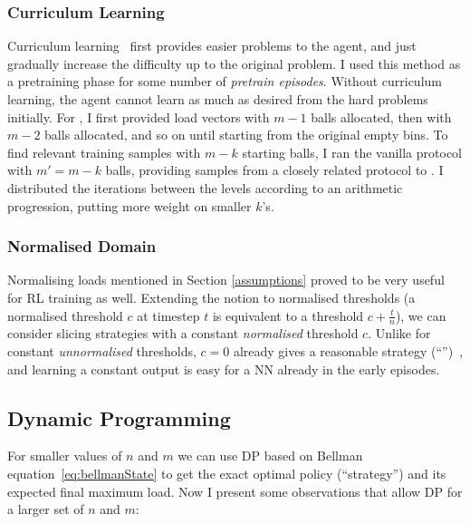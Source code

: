 \subsubsection*{Curriculum Learning}


Curriculum learning~\cite{bengio2009curriculumoriginal} first provides easier problems to the agent, and just gradually increase the difficulty up to the original problem. I used this method as a pretraining phase for some number of \textit{pretrain episodes}. Without curriculum learning, the agent cannot learn as much as desired from the hard problems initially. For \TwoThinning, I first provided load vectors with $m-1$ balls allocated, then with $m-2$ balls allocated, and so on until starting from the original empty bins. To find relevant training samples with $m-k$ starting balls, I ran the vanilla \OneChoice protocol with $m'=m-k$ balls, providing samples from a closely related protocol to \TwoThinning. I distributed the iterations between the levels according to an arithmetic progression, putting more weight on smaller $k$'s.



\subsubsection*{Normalised Domain} \label{normalised-domain}

Normalising loads mentioned in Section \ref{assumptions} proved to be very useful for RL training as well. Extending the notion to normalised thresholds (a normalised threshold $c$ at timestep $t$ is equivalent to a threshold $c+\frac{t}{n}$), we can consider slicing strategies with a constant \textit{normalised} threshold $c$. Unlike for constant \textit{unnormalised} thresholds, $c=0$ already gives a reasonable strategy (``\MeanThinning'')~\cite{los2022cachingpackingthinningtwinning}, and learning a constant output is easy for a NN already in the early episodes.


\subsection{Dynamic Programming} \label{two-thinning-dp}


For smaller values of $n$ and $m$ we can use DP based on Bellman equation~\eqref{eq:bellmanState} to get the exact optimal policy (``\DP strategy'') and its expected final maximum load. Now I present some observations that allow DP for a larger set of $n$ and $m$:


